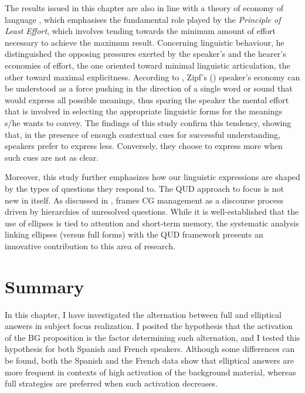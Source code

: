The results issued in this chapter are also in line with a theory of economy of language \parencite{zipf1949human}, which emphasises the fundamental role played by the \textit{Principle of Least Effort}, which involves tending towards the minimum amount of effort necessary to achieve the maximum result.  Concerning linguistic behaviour, he distinguished the opposing pressures exerted by the speaker’s and the hearer’s economies of effort, the one oriented toward minimal linguistic articulation, the other toward maximal explicitness.
According to \textcite{carston2005note}, Zipf’s (\citeyear{zipf1949human}) speaker’s economy can be understood as a force pushing in the direction of a single word or sound that would express all possible meanings, thus sparing the speaker the mental effort that is involved in selecting the appropriate linguistic forms for the meanings s/he wants to convey.
The findings of this study confirm this tendency, showing that, in the presence of enough contextual cues for successful understanding, speakers prefer to express less. Conversely, they choose to express more when such cues are not as clear. 

Moreover, this study further emphasizes how our linguistic expressions are shaped by the types of questions they respond to. The QUD approach to focus is not new in itself. As discussed in , \textcite{roberts1996information} frames CG management as a discourse process driven by hierarchies of unresolved questions. While it is well-established that the use of ellipses is tied to attention and short-term memory, the systematic analysis linking ellipses (versus full forms) with the QUD framework presents an innovative contribution to this area of research.

\section{Summary} \label{sub:5.6}

In this chapter, I have investigated the alternation between full and elliptical answers in subject focus realization. I posited the hypothesis that the activation of the BG proposition is the factor determining such alternation, and I tested this hypothesis for both Spanish and French speakers. Although some differences can be found, both the Spanish and the French data show that elliptical answers are more frequent in contexts of high activation of the background material, whereas full strategies are preferred when such activation decreases.

